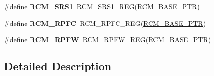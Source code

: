 \begin{DoxyCompactItemize}
\#define {\bfseries R\+C\+M\+\_\+\+S\+R\+S1}~R\+C\+M\+\_\+\+S\+R\+S1\+\_\+\+R\+EG(\hyperlink{group___r_c_m___peripheral_ga25ab3aa8d593d455ed36a52c77f88234}{R\+C\+M\+\_\+\+B\+A\+S\+E\+\_\+\+P\+TR})
\item 
\mbox{\label{group___r_c_m___register___accessor___macros_ga1c19f66051e218d534efc33ec09cc461}} 
\#define {\bfseries R\+C\+M\+\_\+\+R\+P\+FC}~R\+C\+M\+\_\+\+R\+P\+F\+C\+\_\+\+R\+EG(\hyperlink{group___r_c_m___peripheral_ga25ab3aa8d593d455ed36a52c77f88234}{R\+C\+M\+\_\+\+B\+A\+S\+E\+\_\+\+P\+TR})
\item 
\mbox{\label{group___r_c_m___register___accessor___macros_ga4cf7545d65e6e6c3e1848b7687d8f367}} 
\#define {\bfseries R\+C\+M\+\_\+\+R\+P\+FW}~R\+C\+M\+\_\+\+R\+P\+F\+W\+\_\+\+R\+EG(\hyperlink{group___r_c_m___peripheral_ga25ab3aa8d593d455ed36a52c77f88234}{R\+C\+M\+\_\+\+B\+A\+S\+E\+\_\+\+P\+TR})
\end{DoxyCompactItemize}


\subsection{Detailed Description}
